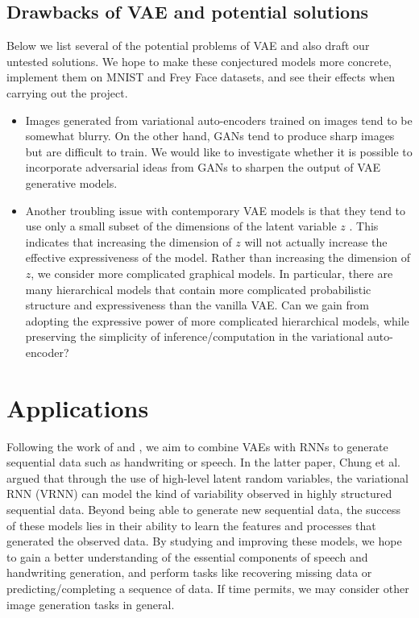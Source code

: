 \documentclass[11pt]{article}
\begin{document}
\subsection*{Drawbacks of VAE and potential solutions}

Below we list several of the potential problems of VAE and also draft our untested solutions. We hope to make these conjectured models more concrete, implement them on MNIST and Frey Face datasets, and see their effects when carrying out the project.

\begin{itemize}
\item Images generated from variational auto-encoders trained on images tend to be somewhat blurry. \cite{Goodfellow-et-al-2016-Book} On the other hand, GANs tend to produce sharp images but are difficult to train. We would like to investigate whether it is possible to incorporate adversarial ideas from GANs to sharpen the output of VAE generative models.
\item Another troubling issue with contemporary VAE models is that they tend to use only a small subset of the dimensions of the latent variable $z$ \cite{Goodfellow-et-al-2016-Book}. This indicates that increasing the dimension of $z$ will not actually increase the effective expressiveness of the model. Rather than increasing the dimension of $z$, we consider more complicated graphical models. In particular, there are many hierarchical models that contain more complicated probabilistic structure and expressiveness than the vanilla VAE. Can we gain from adopting the expressive power of more complicated hierarchical models, while preserving the simplicity of inference/computation in the variational auto-encoder?
\end{itemize}

\section*{Applications}
Following the work of \cite{gregor2015draw} and \cite{chung2015recurrent}, we aim to combine VAEs with RNNs to generate sequential data such as handwriting or speech. In the latter paper, Chung et al. argued that through the use of high-level latent random variables, the variational RNN (VRNN) can model the kind of variability observed in highly structured sequential data. Beyond being able to generate new sequential data, the success of these models lies in their ability to learn the features and processes that generated the observed data. By studying and improving these models, we hope to gain a better understanding of the essential components of speech and handwriting generation, and perform tasks like recovering missing data or predicting/completing a sequence of data. If time permits, we may consider other image generation tasks in general.
\end{document}
